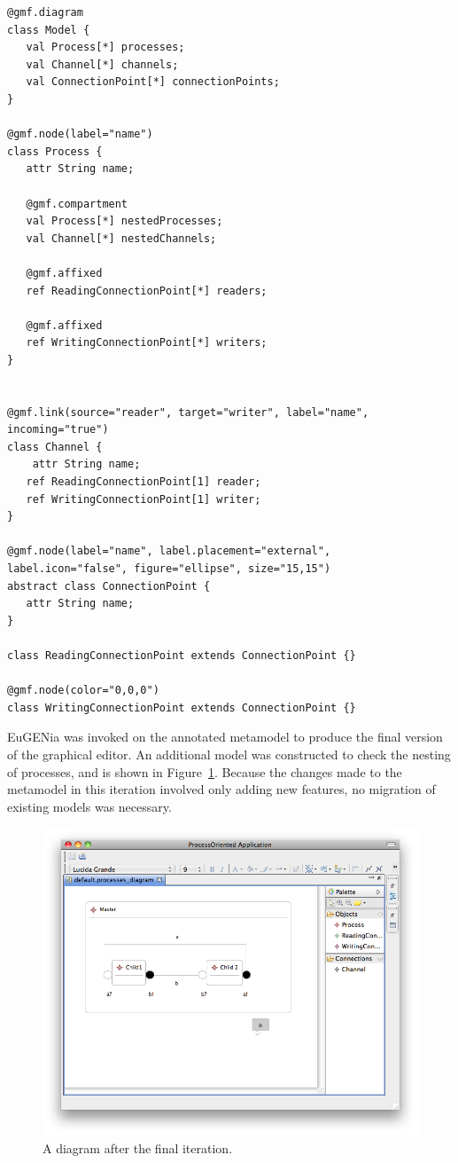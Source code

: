 \begin{lstlisting}[caption=The annotated process-oriented metamodel after six iterations, label=lst:po_it6_mm, language=Emfatic]
@gmf.diagram
class Model {
   val Process[*] processes;
   val Channel[*] channels;
   val ConnectionPoint[*] connectionPoints;
}

@gmf.node(label="name")
class Process {
   attr String name;

   @gmf.compartment
   val Process[*] nestedProcesses;
   val Channel[*] nestedChannels;
      
   @gmf.affixed
   ref ReadingConnectionPoint[*] readers;
   
   @gmf.affixed
   ref WritingConnectionPoint[*] writers; 
}


@gmf.link(source="reader", target="writer", label="name", incoming="true")
class Channel { 
	attr String name;
   ref ReadingConnectionPoint[1] reader;
   ref WritingConnectionPoint[1] writer;
}

@gmf.node(label="name", label.placement="external", label.icon="false", figure="ellipse", size="15,15")
abstract class ConnectionPoint {
   attr String name;
}

class ReadingConnectionPoint extends ConnectionPoint {}

@gmf.node(color="0,0,0")
class WritingConnectionPoint extends ConnectionPoint {}
\end{lstlisting}

EuGENia was invoked on the annotated metamodel to produce the final version of the graphical editor. An additional model was constructed to check the nesting of processes, and is shown in Figure~\ref{fig:po_it6_model}. Because the changes made to the metamodel in this iteration involved only adding new features, no migration of existing models was necessary.

\begin{figure}[htbp]
	\centering
		\includegraphics[scale=0.5]{A.2.ProcessOriented/images/6_model.png}
	\caption{A diagram after the final iteration.}
	\label{fig:po_it6_model}
\end{figure}


